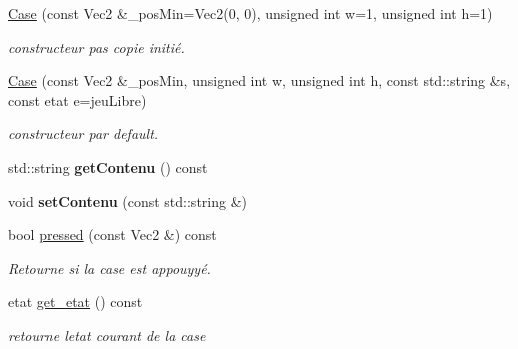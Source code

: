 \begin{DoxyCompactItemize}
\item 
\mbox{\label{class_case_a459fed689a33e6389ff5f6b5620fbb1e}} 
\mbox{\hyperlink{class_case_a459fed689a33e6389ff5f6b5620fbb1e}{Case}} (const Vec2 \&\+\_\+pos\+Min=Vec2(0, 0), unsigned int w=1, unsigned int h=1)
\begin{DoxyCompactList}\small\item\em constructeur pas copie initié. \end{DoxyCompactList}\item 
\mbox{\label{class_case_acfc98a7ba6e29a1c5287834783422be8}} 
\mbox{\hyperlink{class_case_acfc98a7ba6e29a1c5287834783422be8}{Case}} (const Vec2 \&\+\_\+pos\+Min, unsigned int w, unsigned int h, const std\+::string \&s, const etat e=jeu\+Libre)
\begin{DoxyCompactList}\small\item\em constructeur par default. \end{DoxyCompactList}\item 
\mbox{\label{class_case_a152012a9d0be1aff1d0ca89eb784d67f}} 
std\+::string {\bfseries get\+Contenu} () const
\item 
\mbox{\label{class_case_a4f7b7781abc608b880c308728a0d8901}} 
void {\bfseries set\+Contenu} (const std\+::string \&)
\item 
\mbox{\label{class_case_ab22ba706f90de0fac85858156d47d36d}} 
bool \mbox{\hyperlink{class_case_ab22ba706f90de0fac85858156d47d36d}{pressed}} (const Vec2 \&) const
\begin{DoxyCompactList}\small\item\em Retourne si la case est appouyyé. \end{DoxyCompactList}\item 
\mbox{\label{class_case_ae8b2df78f80afdcdfe529ad25859cff9}} 
etat \mbox{\hyperlink{class_case_ae8b2df78f80afdcdfe529ad25859cff9}{get\+\_\+etat}} () const
\begin{DoxyCompactList}\small\item\em retourne l\textquotesingle{}etat courant de la case \end{DoxyCompactList}\end{DoxyCompactItemize}
